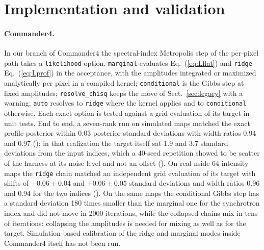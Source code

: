 \section{Implementation and validation}
\label{sec:impl}

\paragraph{Commander4.} In our branch of Commander4 the spectral-index Metropolis step of the
per-pixel path takes a \texttt{likelihood} option. \texttt{marginal} evaluates
Eq.~(\ref{eq:Lflat}) and \texttt{ridge} Eq.~(\ref{eq:Lprof}) in the acceptance, with the
amplitudes integrated or maximized analytically per pixel in a compiled kernel; \texttt{conditional}
is the Gibbs step at fixed amplitudes; \texttt{resolve\_chisq} keeps the move of
Sect.~\ref{sec:legacy} with a warning; \texttt{auto} resolves to \texttt{ridge} where the kernel
applies and to \texttt{conditional} otherwise. Each exact option is tested against a grid evaluation
of its target in unit tests. End to end, a seven-rank run on simulated maps matched the exact profile
posterior within 0.03 posterior standard deviations with width ratios 0.94 and 0.97
(); in that realization the target itself sat 1.9 and 3.7 standard deviations from the
input indices, which a 40-seed repetition showed to be scatter of the harness at its noise level and
not an offset (). On real nside-64 intensity maps the \texttt{ridge} chain matched an independent grid
evaluation of its target with shifts of $-0.06 \pm 0.04$ and $+0.06 \pm 0.05$ standard deviations and
width ratios 0.96 and 0.94 for the two indices (). On the same maps the conditional Gibbs
step has a standard deviation 180 times smaller than the marginal one for the synchrotron index and
did not move in 2000 iterations, while the collapsed chains mix in tens of iterations: collapsing the
amplitudes is needed for mixing as well as for the target. Simulation-based calibration of the
ridge and marginal modes inside Commander4 itself has not been run.


